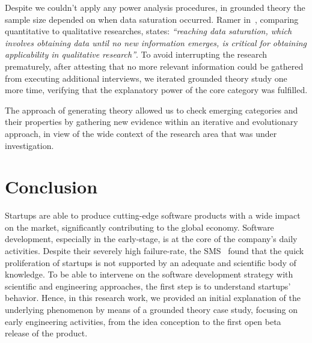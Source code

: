 \documentclass[10pt,journal,letterpaper,compsoc]{IEEEtran}
\begin{document}
Despite we couldn't apply any power analysis procedures, in grounded theory the
sample size depended on when data saturation occurred. Ramer in~\cite{Ramer},
comparing quantitative to qualitative researches, states: \textit{``reaching
data saturation, which involves obtaining data until no new information emerges,
is critical for obtaining applicability in qualitative research''}. To avoid
interrupting the research prematurely, after attesting that no more relevant
information could be gathered from executing additional interviews, we iterated
grounded theory study one more time, verifying that the explanatory power of the
core category was fulfilled.

The approach of generating theory allowed us to check emerging categories and
their properties by gathering new evidence within an iterative and evolutionary
approach, in view of the wide context of the research area that was under
investigation.



\section{Conclusion} \label{conc} 
Startups are able to produce cutting-edge software products with a wide impact 
on the market, significantly contributing to the global economy. Software 
development, especially in the early-stage, is at the core of the company's 
daily activities. Despite their severely high failure-rate, the SMS~\cite{SMS} 
found that the quick proliferation of startups is not supported by an adequate 
and scientific body of knowledge. %
To be able to intervene on the software development strategy with scientific and 
engineering approaches, the first step is to understand startups' behavior. 
Hence, in this research work, we provided an initial explanation of the 
underlying phenomenon by means of a grounded theory case study, focusing on 
early engineering activities, from the idea conception to the first open beta 
release of the product.
\end{document}
